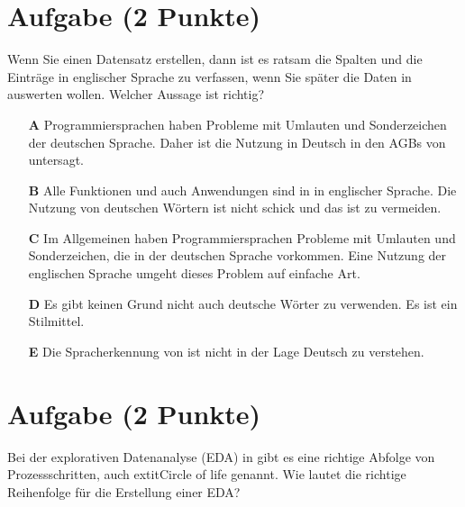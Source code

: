 \documentclass[a4paper, 9pt]{scrartcl}\usepackage[]{graphicx}\usepackage[]{xcolor}
\begin{document}
\section{Aufgabe \hfill (2 Punkte)}



Wenn Sie einen Datensatz erstellen, dann ist es ratsam die Spalten und die Einträge in englischer Sprache zu verfassen, wenn Sie später die Daten in \Rlogo auswerten wollen. Welcher Aussage ist richtig?



\begin{enumerate}
\item [\textbf{A} \msquare] Programmiersprachen haben Probleme mit Umlauten und Sonderzeichen der deutschen Sprache. Daher ist die Nutzung in Deutsch in den AGBs von \Rlogo untersagt.
\item [\textbf{B} \msquare] Alle Funktionen und auch Anwendungen sind in \Rlogo in englischer Sprache. Die Nutzung von deutschen Wörtern ist nicht schick und das ist zu vermeiden.
\item [\textbf{C} \msquare] Im Allgemeinen haben Programmiersprachen Probleme mit Umlauten und Sonderzeichen, die in der deutschen Sprache vorkommen. Eine Nutzung der englischen Sprache umgeht dieses Problem auf einfache Art.
\item [\textbf{D} \msquare] Es gibt keinen Grund nicht auch deutsche Wörter zu verwenden. Es ist ein Stilmittel.
\item [\textbf{E} \msquare] Die Spracherkennung von \Rlogo ist nicht in der Lage Deutsch zu verstehen.
\end{enumerate}

\section{Aufgabe \hfill (2 Punkte)}



Bei der explorativen Datenanalyse (EDA) in \Rlogo gibt es eine richtige Abfolge von Prozessschritten, auch 	extit{Circle of life} genannt. Wie lautet die richtige Reihenfolge für die Erstellung einer EDA?
\end{document}
